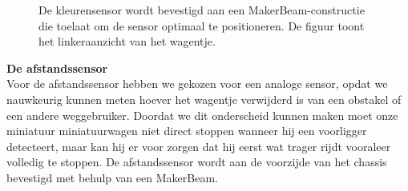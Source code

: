 \documentclass[a4paper,kulak]{kulakarticle}
\begin{document}
\begin{figure}[h]
	
	\caption{De kleurensensor wordt bevestigd aan een MakerBeam-constructie die toelaat om de sensor optimaal te positioneren. De figuur toont het linkeraanzicht van het wagentje.}\label{fig:Linksaanzicht}
\end{figure}

 \textbf{\large De afstandssensor} \\
Voor de afstandssensor hebben we gekozen voor een analoge sensor, opdat we nauwkeurig kunnen meten hoever het wagentje verwijderd is van een obstakel of een andere weggebruiker. Doordat we dit onderscheid kunnen maken moet onze miniatuur miniatuurwagen niet direct stoppen wanneer hij een voorligger detecteert, maar kan hij er voor  zorgen dat hij eerst wat trager rijdt vooraleer volledig te stoppen. De afstandssensor wordt aan de voorzijde van het chassis bevestigd met behulp van een MakerBeam.\\
\end{document}
